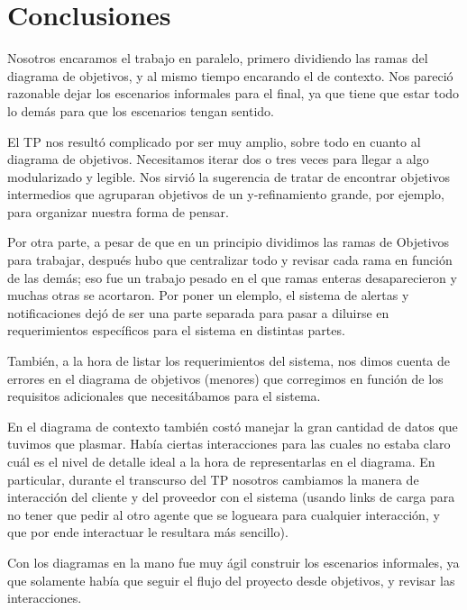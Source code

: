 \section{Conclusiones}

Nosotros encaramos el trabajo en paralelo, primero dividiendo las ramas del diagrama de objetivos, y al mismo tiempo encarando el de contexto. Nos pareció razonable dejar los escenarios informales para el final, ya que tiene que estar todo lo demás para que los escenarios tengan sentido.

El TP nos resultó complicado por ser muy amplio, sobre todo en cuanto al diagrama de objetivos. Necesitamos iterar dos o tres veces para llegar a algo modularizado y legible. Nos sirvió la sugerencia de tratar de encontrar objetivos intermedios que agruparan objetivos de un y-refinamiento grande, por ejemplo, para organizar nuestra forma de pensar.

Por otra parte, a pesar de que en un principio dividimos las ramas de Objetivos para trabajar, después hubo que centralizar todo y revisar cada rama en función de las demás; eso fue un trabajo pesado en el que ramas enteras desaparecieron y muchas otras se acortaron. Por poner un elemplo, el sistema de alertas y notificaciones dejó de ser una parte separada para pasar a diluirse en requerimientos específicos para el sistema en distintas partes.

También, a la hora de listar los requerimientos del sistema, nos dimos cuenta de errores en el diagrama de objetivos (menores) que corregimos en función de los requisitos adicionales que necesitábamos para el sistema.

En el diagrama de contexto también costó manejar la gran cantidad de datos que tuvimos que plasmar. Había ciertas interacciones para las cuales no estaba claro cuál es el nivel de detalle ideal a la hora de representarlas en el diagrama. En particular, durante el transcurso del TP nosotros cambiamos la manera de interacción del cliente y del proveedor con el sistema (usando links de carga para no tener que pedir al otro agente que se logueara para cualquier interacción, y que por ende interactuar le resultara más sencillo).

Con los diagramas en la mano fue muy ágil construir los escenarios informales, ya que solamente había que seguir el flujo del proyecto desde objetivos, y revisar las interacciones.
